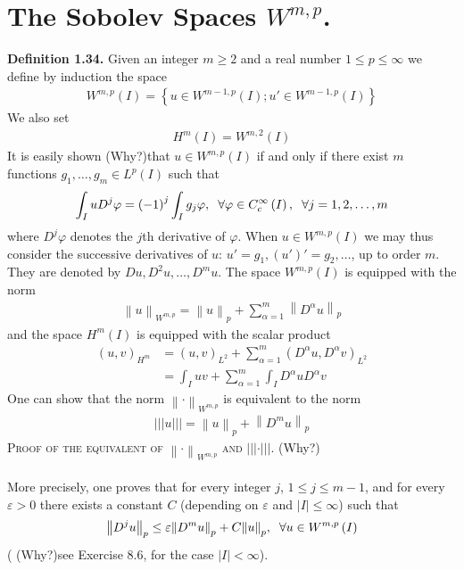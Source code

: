 \documentclass[a4paper,oneside]{article}
\numberwithin{equation}{section}
\begin{document}
\section*{The Sobolev Spaces $W^{m,p}$.}
\textbf{Definition 1.34.} Given an integer $m\ge 2$ and a real number $1\le p\le \infty$ we define by induction the space
\begin{align}
{W^{m,p}}\left( I \right) = \left\{ {u \in {W^{m - 1,p}}\left( I \right);u' \in {W^{m - 1,p}}\left( I \right)} \right\}
\end{align}
We also set
\begin{align}
{H^m}\left( I \right) = {W^{m,2}}\left( I \right)
\end{align}
It is easily shown  (Why?)that $u\in W^{m,p}\left(I\right)$ if and only if there exist $m$ functions $g_1,\ldots,g_m\in L^p\left(I\right)$ such that
\begin{align}
\int_I {u{D^j}\varphi }  = {\left( { - 1} \right)^j}\int_I {{g_j}\varphi } ,\hspace{0.2cm}\forall \varphi  \in C_c^\infty \left( I \right), \hspace{0.2cm}\forall j = 1,2, \ldots ,m
\end{align}
where $D^j \varphi$ denotes the $j$th derivative of $\varphi$. When $u\in W^{m,p}\left(I\right)$ we may thus consider the successive derivatives of $u$: $u' = {g_1},\left( {u'} \right)' = {g_2}, \ldots $, up to order $m$. They are denoted by $Du,D^2u,\ldots,D^mu$. The space $W^{m,p}\left(I\right)$ is equipped with the norm
\begin{align}
{\left\| u \right\|_{{W^{m,p}}}} = {\left\| u \right\|_p} + \sum\limits_{\alpha  = 1}^m {{{\left\| {{D^\alpha }u} \right\|}_p}} 
\end{align}
and the space $H^m\left(I\right)$ is equipped with the scalar product
\begin{align}
{\left( {u,v} \right)_{{H^m}}} &= {\left( {u,v} \right)_{{L^2}}} + \sum\limits_{\alpha  = 1}^m {{{\left( {{D^\alpha }u,{D^\alpha }v} \right)}_{{L^2}}}} \\
& = \int_I {uv}  + \sum\limits_{\alpha  = 1}^m {\int_I {{D^\alpha }u{D^\alpha }v} } 
\end{align}
One can show that the norm ${\left\|  \cdot  \right\|_{{W^{m,p}}}}$ is equivalent to the norm
\begin{align}
|||u||| = {\left\| u \right\|_p} + {\left\| {{D^m}u} \right\|_p}
\end{align}
\textsc{Proof of the equivalent of ${\left\|  \cdot  \right\|_{{W^{m,p}}}}$ and $|||\cdot|||$.}  (Why?)\\
\\
More precisely, one proves that for every integer $j$, $1\le j\le m-1$, and for every $\varepsilon >0$ there exists a constant $C$ (depending on $\varepsilon$ and $\left| I \right| \le \infty $)  such that
\begin{align}
{\left\| {{D^j}u} \right\|_p} \le \varepsilon {\left\| {{D^m}u} \right\|_p} + C{\left\| u \right\|_p},\hspace{0.2cm}\forall u \in {W^{m,p}}\left( I \right)
\end{align}
( (Why?)see Exercise 8.6, \cite{1} for the case $\left| I \right| < \infty $).
\end{document}
